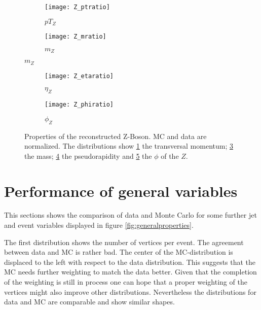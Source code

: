 \begin{figure}[h]
\centering
\begin{subfigure}[b]{0.5\figwidth}
\texttt{[image: Z\_ptratio]}
\caption[Transversal momentum of the reconstructed Z]{$pT_Z$}
\label{fig:zpt}
\end{subfigure}
\quad
\begin{subfigure}[b]{0.5\figwidth}
\texttt{[image: Z\_mratio]}
\caption[mass of the reconstructed $Z$]{$m_Z$}
\label{fig:zm}
\end{subfigure}
\end{figure}


\begin{figure}[h]
\centering
\begin{subfigure}[b]{0.5\figwidth}
\texttt{[image: Z\_etaratio]}
\caption[$\eta$ of the reconstructed $Z$]{$\eta_Z$}
\label{fig:zeta}
\end{subfigure}
\quad
\begin{subfigure}[b]{0.5\figwidth}
\texttt{[image: Z\_phiratio]}
\caption[$\phi$ of the reconstructed $Z$]{$\phi_Z$}
\label{fig:zphi}
\end{subfigure}
\caption{Properties of the reconstructed Z-Boson. MC and data are normalized. The distributions show \ref{fig:zpt} the transversal momentum; \ref{fig:zm} the mass; \ref{fig:zeta} the pseudorapidity and \ref{fig:zphi} the $\phi$ of the $Z$.}
\label{fig:z}
\end{figure}



\section{Performance of general variables}


This sections shows the comparison of data and Monte Carlo for some further jet and event variables displayed in figure \ref{fig:generalproperties}.

The first distribution shows the number of vertices per event. The agreement between data and MC is rather bad. The center of the MC-distribution is displaced to the left with respect to the data distribution. This suggests that the MC needs further weighting to match the data better. Given that the completion of the weighting is still in process one can hope that a proper weighting of the vertices might also improve other distributions. Nevertheless the distributions for data and MC are comparable and show similar shapes.

